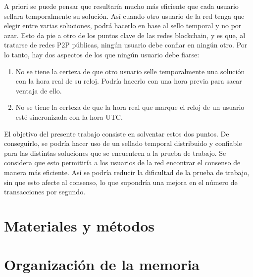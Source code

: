A priori se puede pensar que resultaría mucho más eficiente que cada usuario sellara temporalmente su solución. Así cuando otro usuario de la red tenga que elegir entre varias soluciones, podrá hacerlo en base al sello temporal y no por azar. Esto da pie a otro de los puntos clave de las redes blockchain, y es que, al tratarse de redes P2P públicas, ningún usuario debe confiar en ningún otro. Por lo tanto, hay dos aspectos de los que ningún usuario debe fiarse:
\begin{enumerate}
	\item No se tiene la certeza de que otro usuario selle temporalmente una solución con la hora real de su reloj. Podría hacerlo con una hora previa para sacar ventaja de ello.
	\item No se tiene la certeza de que la hora real que marque el reloj de un usuario esté sincronizada con la hora UTC.
\end{enumerate}
	
El objetivo del presente trabajo consiste en solventar estos dos puntos. De conseguirlo, se podría hacer uso de un sellado temporal distribuido y confiable para las distintas soluciones que se encuentren a la prueba de trabajo. Se considera que esto permitiría a los usuarios de la red encontrar el consenso de manera más eficiente. Así se podría reducir la dificultad de la prueba de trabajo, sin que esto afecte al consenso, lo que supondría una mejora en el número de transacciones por segundo.


\section{Materiales y métodos}

\section{Organización de la memoria}